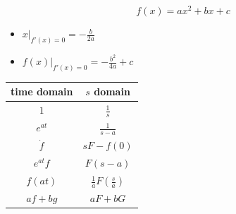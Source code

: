 \documentclass[landscape,a0paper,fontscale=0.285]{baposter} %
\begin{document}
\begin{poster}
{\colorbox[HTML]{CCFFFF}{}

$$ f(x) = ax^2+bx+c $$

\begin{itemize}
  \item \( x|_{f'(x)=0} = -\frac{b}{2a} \)
  \item \( f(x)|_{f'(x)=0} = -\frac{b^2}{4a}+c \)
\end{itemize}

\colorbox[HTML]{CCFFFF}{}
\centering
{
\renewcommand{\arraystretch}{1.5}

\begin{tabular}{|c|c|}
\hline
\textbf{time domain} & \( s \) \textbf{domain} \\
\toprule\bottomrule
\( 1 \) & \( \frac{1}{s} \) \\\hline
\( e^{at} \) & \( \frac{1}{s-a} \) \\\hline
\( \dot{f} \) & \( sF - f(0) \) \\\hline
\( e^{at}f \) & \( F(s-a) \) \\\hline
\( f(at) \) & \( \frac{1}{a}F\left(\frac{s}{a}\right) \) \\\hline
\( af+bg \) & \( aF+bG \) \\\hline

\end{tabular}
}



}



\end{poster}
\end{document}
